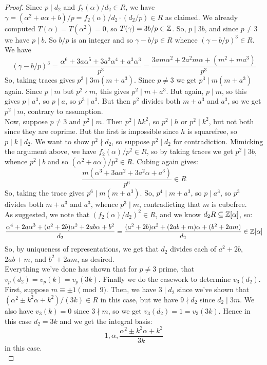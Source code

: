 \begin{proof}
    Since $p \mid d_2$ and $f_2(\alpha)/d_2 \in R$, we have $\gamma = (\alpha^2+a\alpha+b)/p = f_2(\alpha)/d_2 \cdot (d_2/p) \in R$ as claimed. We already computed $T(\alpha) = T(\alpha^2) = 0$, so $T(\gamma) = 3b/p \in \mathbb{Z}$. So, $p \mid 3b$, and since $p \neq 3$ we have $p \mid b$. So $b/p$ is an integer and so $\gamma-b/p \in R$ whence $(\gamma-b/p)^3 \in R$. We have
    \[ (\gamma-b/p)^3 = \frac{\alpha^6+3a\alpha^5+3a^2\alpha^4+a^3\alpha^3}{p^3} = \frac{3am\alpha^2+2a^2m\alpha+(m^2+ma^3)}{p^3} \]
    So, taking traces gives $p^3 \mid 3m(m+a^3)$. Since $p \neq 3$ we get $p^3 \mid m(m+a^3)$ again. Since $p \mid m$ but $p^2 \nmid m$, this gives $p^2 \mid m+a^3$. But again, $p \mid m$, so this gives $p \mid a^3$, so $p \mid a$, so $p^3 \mid a^3$. But then $p^2$ divides both $m+a^3$ and $a^3$, so we get $p^2 \mid m$, contrary to assumption. \\

    Now, suppose $p \neq 3$ and $p^2 \mid m$. Then $p^2 \mid hk^2$, so $p^2 \mid h$ or $p^2 \mid k^2$, but not both since they are coprime. But the first is impossible since $h$ is squarefree, so $p \mid k \mid d_2$. We want to show $p^2 \nmid d_2$, so suppose $p^2 \mid d_2$ for contradiction. Mimicking the argument above, we have $f_2(\alpha)/p^2 \in R$, so by taking traces we get $p^2 \mid 3b$, whence $p^2 \mid b$ and so $(\alpha^2+a\alpha)/p^2 \in R$. Cubing again gives:
    \[ \frac{m(\alpha^3+3a\alpha^2+3a^2\alpha+a^3)}{p^6} \in R \]
    So, taking the trace gives $p^6 \mid m(m+a^3)$. So, $p^4 \mid m+a^3$, so $p \mid a^3$, so $p^3$ divides both $m+a^3$ and $a^3$, whence $p^3 \mid m$, contradicting that $m$ is cubefree. \\

    As suggested, we note that $(f_2(\alpha)/d_2)^2 \in R$, and we know $d_2R \subseteq \mathbb{Z}[\alpha]$, so:
    \[ \frac{\alpha^4+2a\alpha^3+(a^2+2b)\alpha^2+2ab\alpha+b^2}{d_2} = \frac{(a^2+2b)\alpha^2+(2ab+m)\alpha+(b^2+2am)}{d_2} \in \mathbb{Z}[\alpha] \]
    So, by uniqueness of representations, we get that $d_2$ divides each of $a^2+2b$, $2ab+m$, and $b^2+2am$, as desired. \\

    Everything we've done has shown that for $p \neq 3$ prime, that $v_p(d_2) = v_p(k) = v_p(3k)$. Finally we do the casework to determine $v_3(d_2)$. First, suppose $m \equiv \pm 1 \pmod{9}$. Then, we have $3 \mid d_2$ since we've shown that $(\alpha^2 \pm k^2\alpha + k^2)/(3k) \in R$ in this case, but we have $9 \nmid d_2$ since $d_2 \mid 3m$. We also have $v_3(k) = 0$ since $3 \nmid m$, so we get $v_3(d_2) = 1 = v_3(3k)$. Hence in this case $d_2 = 3k$ and we get the integral basis:
    \[ 1,\alpha,\frac{\alpha^2 \pm k^2\alpha + k^2}{3k} \]
    in this case. \\


\end{proof}
